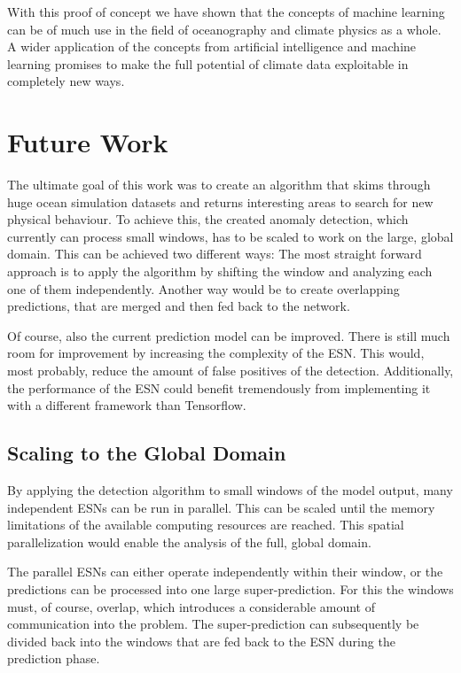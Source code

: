 With this proof of concept we have shown that the concepts of machine learning
can be of much use in the field of oceanography and climate physics as a whole.
A wider application of the concepts from artificial intelligence and machine
learning promises to make the full potential of climate data exploitable in
completely new ways.



\section{Future Work}%
\label{sec:future_work}

The ultimate goal of this work was to create an algorithm that skims through
huge ocean simulation datasets and returns interesting areas to search for new
physical behaviour. To achieve this, the created anomaly detection, which
currently can process small windows, has to be scaled to work on the large,
global domain. This can be achieved two different ways: The most straight
forward approach is to apply the algorithm by shifting the window and analyzing
each one of them independently.  Another way would be to create overlapping
predictions, that are merged and then fed back to the network.

Of course, also the current  prediction model can be improved. There is still
much room for improvement by increasing the complexity of the ESN. This would,
most probably, reduce the amount of false positives of the detection.
Additionally, the performance of the ESN could benefit tremendously from
implementing it with a different framework than Tensorflow.

\subsection{Scaling to the Global Domain}%
\label{sub:scaling_to_the_global_domain}

By applying the detection algorithm to small windows of the model output, many
independent ESNs can be run in parallel. This can be scaled until the memory
limitations of the available computing resources are reached.
This spatial parallelization would enable the analysis of the full, global domain.

The parallel ESNs can either operate independently within their window, or the
predictions can be processed into one large super-prediction. For this the
windows must, of course, overlap, which introduces a considerable amount of
communication into the problem. The super-prediction can subsequently be
divided back into the windows that are fed back to the ESN during the
prediction phase.


